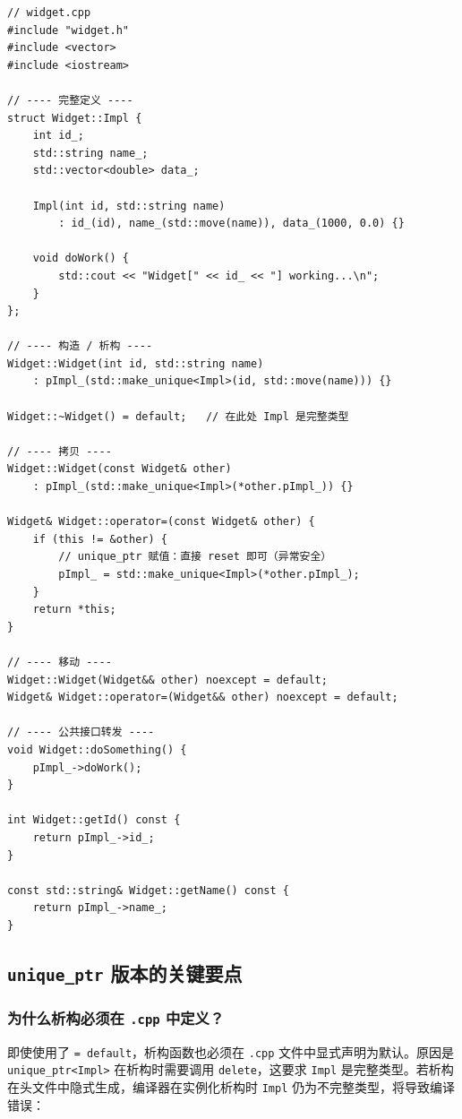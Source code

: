 \documentclass[12pt,a4paper,fontset=fandol]{ctexbook}
\begin{document}
\begin{lstlisting}[caption={PImpl unique\_ptr 版——实现文件}]
// widget.cpp
#include "widget.h"
#include <vector>
#include <iostream>

// ---- 完整定义 ----
struct Widget::Impl {
    int id_;
    std::string name_;
    std::vector<double> data_;

    Impl(int id, std::string name)
        : id_(id), name_(std::move(name)), data_(1000, 0.0) {}

    void doWork() {
        std::cout << "Widget[" << id_ << "] working...\n";
    }
};

// ---- 构造 / 析构 ----
Widget::Widget(int id, std::string name)
    : pImpl_(std::make_unique<Impl>(id, std::move(name))) {}

Widget::~Widget() = default;   // 在此处 Impl 是完整类型

// ---- 拷贝 ----
Widget::Widget(const Widget& other)
    : pImpl_(std::make_unique<Impl>(*other.pImpl_)) {}

Widget& Widget::operator=(const Widget& other) {
    if (this != &other) {
        // unique_ptr 赋值：直接 reset 即可（异常安全）
        pImpl_ = std::make_unique<Impl>(*other.pImpl_);
    }
    return *this;
}

// ---- 移动 ----
Widget::Widget(Widget&& other) noexcept = default;
Widget& Widget::operator=(Widget&& other) noexcept = default;

// ---- 公共接口转发 ----
void Widget::doSomething() {
    pImpl_->doWork();
}

int Widget::getId() const {
    return pImpl_->id_;
}

const std::string& Widget::getName() const {
    return pImpl_->name_;
}
\end{lstlisting}

\subsection{\texttt{unique\_ptr} 版本的关键要点}

\subsubsection{为什么析构必须在 \texttt{.cpp} 中定义？}

即使使用了 \texttt{= default}，析构函数也必须在 \texttt{.cpp} 文件中显式声明为默认。原因是 \texttt{unique\_ptr<Impl>} 在析构时需要调用 \texttt{delete}，这要求 \texttt{Impl} 是完整类型。若析构在头文件中隐式生成，编译器在实例化析构时 \texttt{Impl} 仍为不完整类型，将导致编译错误：
\end{document}
